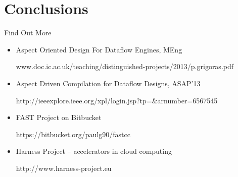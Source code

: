 \section{Conclusions}
\begin{frame}{Find Out More}
\begin{itemize}
    \setlength{\itemsep}{15pt}
\item Aspect Oriented Design For Dataflow Engines, MEng

  {\scriptsize \textcolor{UniBlue}{www.doc.ic.ac.uk/teaching/distinguished-projects/2013/p.grigoras.pdf}}

\item Aspect Driven Compilation for Dataflow Designs, ASAP'13

  {\scriptsize \textcolor{UniBlue}{http://ieeexplore.ieee.org/xpl/login.jsp?tp=\&arnumber=6567545}}

\item FAST Project on Bitbucket

  {\scriptsize \textcolor{UniBlue}{https://bitbucket.org/paulg90/fastcc}}

\item Harness Project -- accelerators in cloud computing

  {\scriptsize \textcolor{UniBlue}{http://www.harness-project.eu}}
\end{itemize}

\end{frame}

